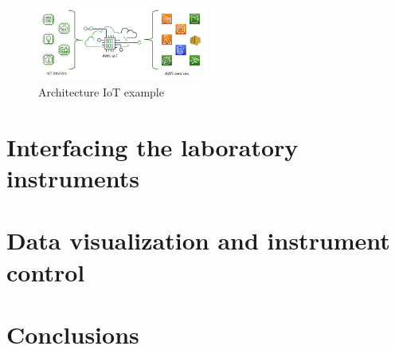 \documentclass[10pt]{article}
\begin{document}
	\begin{figure}[h]
	\centering
	\includegraphics[width=0.5\textwidth]{architecture}
	\caption{Architecture IoT example}
	\label{architecture}
	\end{figure}

\section*{Interfacing the laboratory instruments}

\blindtext

\section*{Data visualization and instrument control}

\blindtext

\section*{Conclusions}

\blindtext
\end{document}
